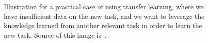\begin{figure}[!htbp]
  \centering
  \caption{Illustration for a practical case of using transfer learning, where we have insufficient data on the new task, and we want to leverage the knowledge learned from another relevant task in order to learn the new task. Source of this image is~\citep{transimage}.}
  \label{fig:illustrate_TL}
\end{figure}

